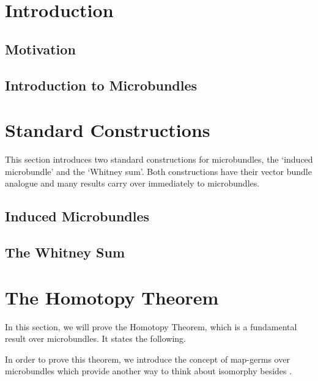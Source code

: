 \documentclass{article}
\begin{document}


\tableofcontents
\clearpage
\section{Introduction}\label{chapter::introduction}
\subsection*{Motivation}\label{section::motivation}

\subsection*{Introduction to Microbundles}\label{section::microbundle}

\section{Standard Constructions}\label{chapter::constructions}
\begin{myparagraph}
This section introduces two standard constructions for microbundles,
the `induced microbundle' and the `Whitney sum'.
Both constructions have their vector bundle analogue
and many results carry over immediately to microbundles.
\end{myparagraph}
\subsection*{Induced Microbundles}\label{section::induced}

\subsection*{The Whitney Sum}\label{section::whitney}

\section{The Homotopy Theorem}\label{chapter::homotopy}
\begin{myparagraph}
In this section, we will prove the Homotopy Theorem,
which is a fundamental result over microbundles.
It states the following.
\end{myparagraph}

\begin{myparagraph}
In order to prove this theorem,
we introduce the concept of map-germs
over microbundles which provide another way
to think about isomorphy besides .
\end{myparagraph}


\end{document}
